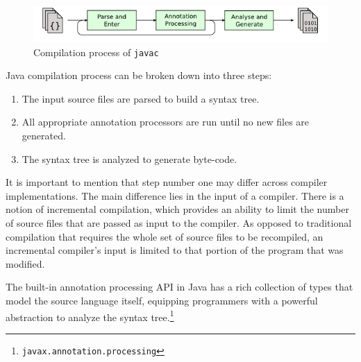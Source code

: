 \begin{figure}[H]\centering
    \includegraphics[scale=0.8]{images/javac-flow.png}
    \caption[Compilation process of javac]{Compilation process of \texttt{javac}\footnotemark }\label{fig:javac-flow}
\end{figure}

Java compilation process can be broken down into three steps:

\begin{enumerate}
    \item The input source files are parsed to build a syntax tree.
    \item All appropriate annotation processors are run until no new files are generated.
    \item The syntax tree is analyzed to generate byte-code.
\end{enumerate}

It is important to mention that step number one may differ across compiler implementations. The main difference lies in the input of a compiler. There is a notion of incremental compilation, which provides an ability to limit the number of source files that are passed as input to the compiler. As opposed to traditional compilation that requires the whole set of source files to be recompiled, an incremental compiler’s input is limited to that portion of the program that was modified.

\n

The built-in annotation processing API in Java has a rich collection of types that model the source language itself, equipping programmers with a powerful abstraction to analyze the syntax tree.\footnote{\texttt{javax.annotation.processing}}
